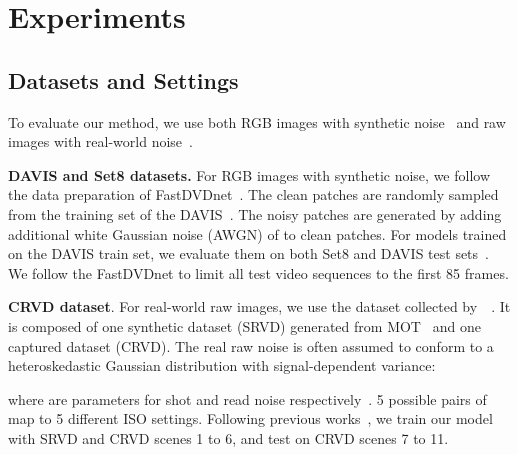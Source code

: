 \documentclass[sigconf]{acmart}
\begin{document}
\section{Experiments}



\subsection{Datasets and Settings}
To evaluate our method, we use both RGB images with synthetic noise~\cite{Khoreva2018Video} and raw images with real-world noise~\cite{yue2020supervised}. 

\textbf{DAVIS and Set8 datasets.}
For RGB images with synthetic noise, we follow the data preparation of FastDVDnet~\cite{Tassano2020FastDVDNet}. 
The clean patches
are randomly sampled from the training set of the DAVIS~\cite{Khoreva2018Video}. 
The noisy patches are generated by adding additional white Gaussian noise (AWGN) of  to clean patches.
For models trained on the DAVIS train set, we evaluate them on both Set8 and DAVIS test sets~\cite{Tassano2020FastDVDNet}.
We follow the FastDVDnet to limit all test video sequences to the first 85 frames.

\textbf{CRVD dataset}.
For real-world raw images, we use the dataset collected by~\citeauthor{yue2020supervised}~\cite{yue2020supervised}. It is composed of one synthetic dataset (SRVD) generated from MOT~\cite{Milan2016MOT16AB} and one captured dataset (CRVD). The real raw noise is often assumed to conform to a heteroskedastic Gaussian distribution with signal-dependent variance:

where  are parameters for shot and read noise respectively~\cite{Maggioni2021Efficient}.
5 possible pairs of  map to 5 different ISO settings.
Following previous works~\cite{yue2020supervised, Maggioni2021Efficient}, we train our model with SRVD and CRVD scenes 1 to 6, and test on CRVD scenes 7 to 11. 














\vspace{-5pt}
\end{document}
